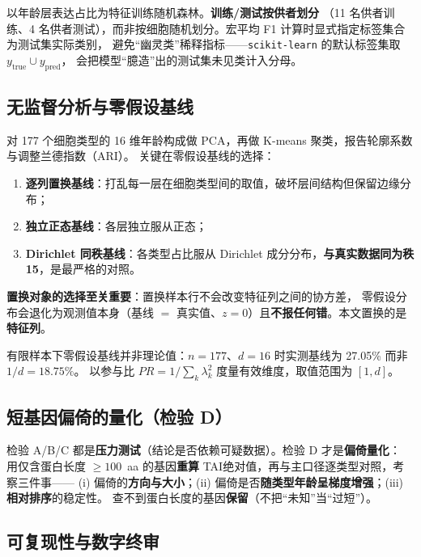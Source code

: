 \documentclass{cjc}
\newcommand{\tai}{\textrm{TAI}}
\begin{document}
以年龄层表达占比为特征训练随机森林\cite{breiman2001}。\textbf{训练/测试按供者划分}
（11 名供者训练、4 名供者测试），而非按细胞随机划分。宏平均 F1 计算时显式指定标签集合为测试集实际类别，
避免“幽灵类”稀释指标——\texttt{scikit-learn} 的默认标签集取 $y_{\text{true}} \cup y_{\text{pred}}$，
会把模型“臆造”出的测试集未见类计入分母。

\subsection{无监督分析与零假设基线}

对 177 个细胞类型的 16 维年龄构成做 PCA，再做 K-means 聚类，报告轮廓系数\cite{rousseeuw1987}与调整兰德指数（ARI）\cite{hubert1985}。
关键在零假设基线的选择：
\begin{enumerate}[label=(\roman*)]
  \item \textbf{逐列置换基线}：打乱每一层在细胞类型间的取值，破坏层间结构但保留边缘分布；
  \item \textbf{独立正态基线}：各层独立服从正态；
  \item \textbf{Dirichlet 同秩基线}：各类型占比服从 Dirichlet 成分分布，\textbf{与真实数据同为秩 15}，是最严格的对照。
\end{enumerate}

\textbf{置换对象的选择至关重要}：置换样本行不会改变特征列之间的协方差，
零假设分布会退化为观测值本身（基线 $=$ 真实值、$z = 0$）且\textbf{不报任何错}。本文置换的是\textbf{特征列}。

有限样本下零假设基线并非理论值：$n = 177$、$d = 16$ 时实测基线为 27.05\% 而非 $1/d = 18.75\%$。
以参与比 $PR = 1/\sum_k \lambda_k^2$ 度量有效维度，取值范围为 $[1, d]$。

\subsection{短基因偏倚的量化（检验 D）}

检验 A/B/C 都是\textbf{压力测试}（结论是否依赖可疑数据）。检验 D 才是\textbf{偏倚量化}：
用仅含蛋白长度 $\ge 100$~aa 的基因\textbf{重算} \tai 绝对值，再与主口径逐类型对照，考察三件事——
(i) 偏倚的\textbf{方向与大小}；(ii) 偏倚是否\textbf{随类型年龄呈梯度增强}；(iii) \textbf{相对排序}的稳定性。
查不到蛋白长度的基因\textbf{保留}（不把“未知”当“过短”）。

\subsection{可复现性与数字终审}
\end{document}
